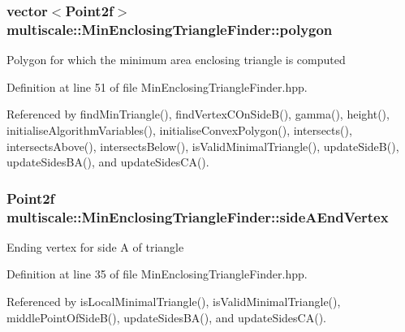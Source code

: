 \hypertarget{classmultiscale_1_1MinEnclosingTriangleFinder_add5aecf2c138345091d55076bdc253a4}{
\subsubsection[{polygon}]{\setlength{\rightskip}{0pt plus 5cm}vector$<$Point2f$>$ multiscale\-::\-Min\-Enclosing\-Triangle\-Finder\-::polygon\hspace{0.3cm}{\ttfamily [private]}}}\label{classmultiscale_1_1MinEnclosingTriangleFinder_add5aecf2c138345091d55076bdc253a4}
Polygon for which the minimum area enclosing triangle is computed 

Definition at line 51 of file Min\-Enclosing\-Triangle\-Finder.\-hpp.



Referenced by find\-Min\-Triangle(), find\-Vertex\-C\-On\-Side\-B(), gamma(), height(), initialise\-Algorithm\-Variables(), initialise\-Convex\-Polygon(), intersects(), intersects\-Above(), intersects\-Below(), is\-Valid\-Minimal\-Triangle(), update\-Side\-B(), update\-Sides\-B\-A(), and update\-Sides\-C\-A().

\hypertarget{classmultiscale_1_1MinEnclosingTriangleFinder_a132a1e2eed61d579e6038089fe08d150}{
\subsubsection[{side\-A\-End\-Vertex}]{\setlength{\rightskip}{0pt plus 5cm}Point2f multiscale\-::\-Min\-Enclosing\-Triangle\-Finder\-::side\-A\-End\-Vertex\hspace{0.3cm}{\ttfamily [private]}}}\label{classmultiscale_1_1MinEnclosingTriangleFinder_a132a1e2eed61d579e6038089fe08d150}
Ending vertex for side A of triangle 

Definition at line 35 of file Min\-Enclosing\-Triangle\-Finder.\-hpp.



Referenced by is\-Local\-Minimal\-Triangle(), is\-Valid\-Minimal\-Triangle(), middle\-Point\-Of\-Side\-B(), update\-Sides\-B\-A(), and update\-Sides\-C\-A().

